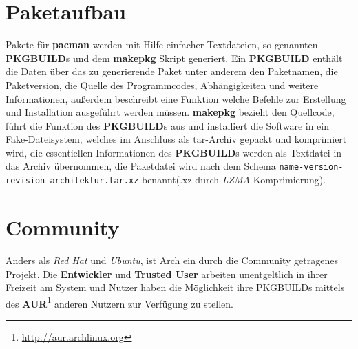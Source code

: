 \documentclass[10pt,DIV14,twocolumn]{scrartcl}
\begin{document}
\section*{Paketaufbau}
Pakete f\"{u}r \textbf{pacman} werden mit Hilfe einfacher Textdateien, so genannten \textbf{PKGBUILD}s und dem \textbf{makepkg} Skript generiert. Ein \textbf{PKGBUILD} enth\"{a}lt die Daten \"{u}ber das zu generierende Paket unter anderem den Paketnamen,  die Paketversion, die Quelle des Programmcodes, Abh\"{a}ngigkeiten und weitere Informationen, außerdem beschreibt eine Funktion welche Befehle zur Erstellung und Installation ausgef\"{u}hrt werden m\"{u}ssen. \textbf{makepkg} bezieht den Quellcode, f\"{u}hrt die Funktion des \textbf{PKGBUILD}s aus und installiert die Software in ein Fake-Dateisystem, welches im Anschluss als tar-Archiv gepackt und komprimiert wird, die essentiellen Informationen des \textbf{PKGBUILD}s werden als Textdatei in das Archiv \"{u}bernommen, die Paketdatei wird nach dem Schema \texttt{name-version-revision-architektur.tar.xz} benannt(.xz durch \textit{LZMA}-Komprimierung).

\section*{Community}
Anders als \textit{Red Hat} und \textit{Ubuntu}, ist Arch ein durch die Community getragenes Projekt. Die \textbf{Entwickler} und \textbf{Trusted User} arbeiten unentgeltlich in ihrer Freizeit am System und Nutzer haben die M\"{o}glichkeit ihre PKGBUILDs mittels des \textbf{AUR}\footnote{\url{http://aur.archlinux.org}} anderen Nutzern zur Verf\"{u}gung zu stellen.
\end{document}
